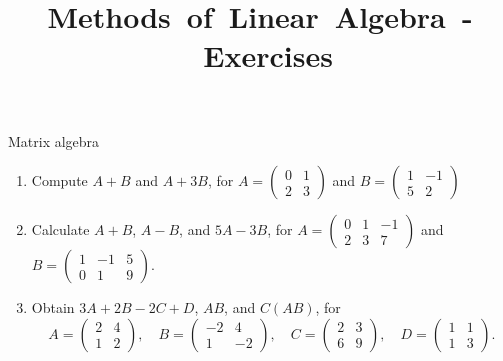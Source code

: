 \documentclass[9pt]{beamer}
\title{\huge \mbox{Methods of Linear Algebra - Exercises}}
\begin{document}
\maketitle

\begin{frame}{Matrix algebra}

    \begin{enumerate}[leftmargin = 0.35cm, label = \arabic*., rightmargin = 0.2cm]
        
        \item Compute $A +B$ and $A + 3B$, for $A = 
        \begin{pmatrix}
        0 & 1 \\
        2 & 3 
        \end{pmatrix}$ and $B = 
        \begin{pmatrix}
        1 & -1 \\
        5 & 2
        \end{pmatrix}$

        \item Calculate $A + B$, $A - B$, and $5A - 3B$, for 
        $A =
        \begin{pmatrix}
        0 & 1 & -1 \\
        2 & 3 & 7
        \end{pmatrix}$ and $B =
        \begin{pmatrix}
        1 & -1 & 5 \\
        0 & 1 & 9
        \end{pmatrix}$.
        \medskip
        
        \item Obtain $3A + 2B - 2C + D$, $AB$, and $C(AB)$, for
        $$
        A = 
        \begin{pmatrix}
        2 & 4 \\
        1 & 2
        \end{pmatrix},\quad 
        B = 
        \begin{pmatrix}
        -2 & 4 \\
        1 & -2
        \end{pmatrix},\quad
        C = 
        \begin{pmatrix}
        2 & 3 \\
        6 & 9
        \end{pmatrix},\quad 
        D = 
        \begin{pmatrix}
        1 & 1 \\
        1 & 3
        \end{pmatrix}.
        $$
        \medskip
        

\end{enumerate}
\end{frame}
\end{document}

